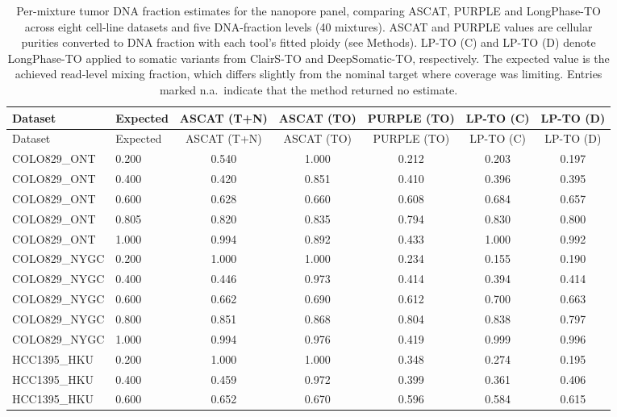 \documentclass[pdflatex,sn-nature]{sn-jnl}
\begin{document}
\begin{small}
\begin{longtable}{@{}llccccc@{}}
  \caption[Tumor DNA fraction estimates for the nanopore panel]%
  {Per-mixture tumor DNA fraction estimates for the nanopore panel, comparing ASCAT, PURPLE and
  LongPhase-TO across eight cell-line datasets and five DNA-fraction levels (40 mixtures). ASCAT and
  PURPLE values are cellular purities converted to DNA fraction with each tool's fitted ploidy (see Methods).
  LP-TO (C) and LP-TO (D) denote LongPhase-TO applied to somatic variants from ClairS-TO and DeepSomatic-TO, respectively. The expected value is the achieved read-level mixing fraction, which differs slightly from the nominal target where coverage was limiting. Entries marked n.a.\ indicate that the method returned no estimate.}
  \label{tab:tumor-purity}\\
  \toprule
  Dataset & Expected & ASCAT (T+N) & ASCAT (TO) & PURPLE (TO) & LP-TO (C) & LP-TO (D) \\
  \midrule
  \endfirsthead
  \toprule
  Dataset & Expected & ASCAT (T+N) & ASCAT (TO) & PURPLE (TO) & LP-TO (C) & LP-TO (D) \\
  \midrule
  \endhead
  \bottomrule
  \endlastfoot
  COLO829\_ONT & 0.200 & 0.540 & 1.000 & 0.212 & 0.203 & 0.197 \\
  COLO829\_ONT & 0.400 & 0.420 & 0.851 & 0.410 & 0.396 & 0.395 \\
  COLO829\_ONT & 0.600 & 0.628 & 0.660 & 0.608 & 0.684 & 0.657 \\
  COLO829\_ONT & 0.805 & 0.820 & 0.835 & 0.794 & 0.830 & 0.800 \\
  COLO829\_ONT & 1.000 & 0.994 & 0.892 & 0.433 & 1.000 & 0.992 \\
  \addlinespace
  COLO829\_NYGC & 0.200 & 1.000 & 1.000 & 0.234 & 0.155 & 0.190 \\
  COLO829\_NYGC & 0.400 & 0.446 & 0.973 & 0.414 & 0.394 & 0.414 \\
  COLO829\_NYGC & 0.600 & 0.662 & 0.690 & 0.612 & 0.700 & 0.663 \\
  COLO829\_NYGC & 0.800 & 0.851 & 0.868 & 0.804 & 0.838 & 0.797 \\
  COLO829\_NYGC & 1.000 & 0.994 & 0.976 & 0.419 & 0.999 & 0.996 \\
  \addlinespace
  HCC1395\_HKU & 0.200 & 1.000 & 1.000 & 0.348 & 0.274 & 0.195 \\
  HCC1395\_HKU & 0.400 & 0.459 & 0.972 & 0.399 & 0.361 & 0.406 \\
  HCC1395\_HKU & 0.600 & 0.652 & 0.670 & 0.596 & 0.584 & 0.615 \\

\end{longtable}
\end{small}
\end{document}
